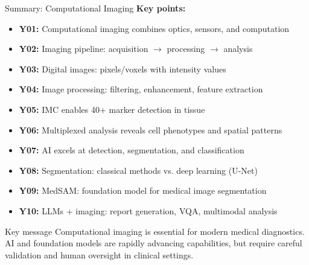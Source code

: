 \documentclass[aspectratio=169, 10pt]{beamer}
\begin{document}
\begin{frame}{Summary: Computational Imaging}
    \textbf{Key points:}
    \begin{itemize}
        \item \textbf{Y01:} Computational imaging combines optics, sensors, and computation
        \item \textbf{Y02:} Imaging pipeline: acquisition $\rightarrow$ processing $\rightarrow$ analysis
        \item \textbf{Y03:} Digital images: pixels/voxels with intensity values
        \item \textbf{Y04:} Image processing: filtering, enhancement, feature extraction
        \item \textbf{Y05:} IMC enables 40+ marker detection in tissue
        \item \textbf{Y06:} Multiplexed analysis reveals cell phenotypes and spatial patterns
        \item \textbf{Y07:} AI excels at detection, segmentation, and classification
        \item \textbf{Y08:} Segmentation: classical methods vs. deep learning (U-Net)
        \item \textbf{Y09:} MedSAM: foundation model for medical image segmentation
        \item \textbf{Y10:} LLMs + imaging: report generation, VQA, multimodal analysis
    \end{itemize}
    
    \vspace{0.2cm}
    \begin{block}{Key message}
        Computational imaging is essential for modern medical diagnostics. AI and foundation models are rapidly advancing capabilities, but require careful validation and human oversight in clinical settings.
    \end{block}
\end{frame}
\end{document}
